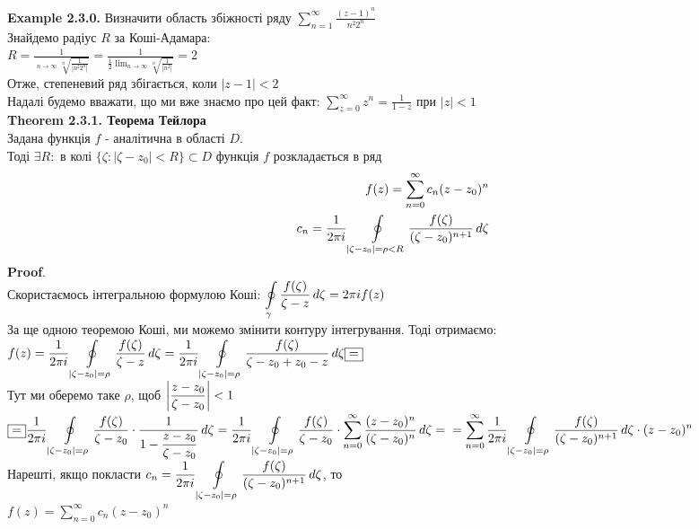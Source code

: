 \documentclass[a4paper, 14pt]{extarticle}
\DeclareMathOperator*\uplim{\overline{lim}}
\def\hugespace{\vspace{5mm} \\}
\begin{document}
	\textbf{Example 2.3.0.} Визначити область збіжності ряду $\displaystyle \sum_{n=1}^{\infty} \frac{(z-1)^n}{n^2 2^n}$\\
	Знайдемо радіус $R$ за Коші-Адамара:\\
	$R = \displaystyle\frac{1}{\displaystyle\uplim_{n \to \infty} \sqrt[n]{\frac{1}{|n^2 2^n|}}} = \frac{1}{\displaystyle \frac{1}{2} \lim_{n \to \infty} \sqrt[n]{\frac{1}{|n^2|}} } = 2$\\
	Отже, степеневий ряд збігається, коли $|z-1|<2$
	\hugespace
	Надалі будемо вважати, що ми вже знаємо про цей факт: $\displaystyle \sum_{z=0}^{\infty} z^n = \frac{1}{1-z}$ при $|z|<1$
	\hugespace
	
	\textbf{Theorem 2.3.1. Теорема Тейлора}\\
	Задана функція $f$ - аналітична в області $D$.\\ Тоді $\exists R:$ в колі $\{\zeta: |\zeta-z_0|<R\} \subset D$ функція $f$ розкладається в ряд
	\begin{align*}
	f(z) = \sum_{n=0}^{\infty} c_n(z-z_0)^n \\
	c_n = \frac{1}{2\pi i} \oint\displaylimits_{|\zeta-z_0|=\rho<R} \frac{f(\zeta)}{(\zeta-z_0)^{n+1}}\,d\zeta
	\end{align*}
	\textbf{Proof}.\\
	Скористаємось інтегральною формулою Коші:
	$\displaystyle \oint\displaylimits_{\gamma} \frac{f(\zeta)}{\zeta-z}\,d\zeta = 2\pi i f(z)$\\
	За ще одною теоремою Коші, ми можемо змінити контуру інтегрування. Тоді отримаємо:\\
	$f(z) = \displaystyle \frac{1}{2\pi i} \oint\displaylimits_{|\zeta-z_0|=\rho} \frac{f(\zeta)}{\zeta-z}\,d\zeta = \frac{1}{2\pi i}\oint\displaylimits_{|\zeta-z_0|=\rho} \frac{f(\zeta)}{\zeta-z_0+z_0-z}\,d\zeta \boxed{=}$\\
	Тут ми оберемо таке $\rho$, щоб $\displaystyle \abs{\frac{z-z_0}{\zeta - z_0}}<1$\\
	$\boxed{=} \displaystyle \frac{1}{2\pi i} \oint\displaylimits_{|\zeta-z_0|=\rho} \frac{f(\zeta)}{\zeta-z_0} \cdot \frac{1}{\displaystyle 1- \frac{z-z_0}{\zeta -z_0}} \,d\zeta = \frac{1}{2\pi i}\oint\displaylimits_{|\zeta-z_0|=\rho} \frac{f(\zeta)}{\zeta-z_0} \cdot \sum_{n=0}^{\infty} \frac{(z-z_0)^n}{(\zeta-z_0)^n} \,d\zeta = \\ = \sum_{n=0}^{\infty}\frac{1}{2\pi i} \oint\displaylimits_{|\zeta-z_0|=\rho} \frac{f(\zeta)}{(\zeta-z_0)^{n+1}} \,d\zeta \cdot (z-z_0)^n$\\
	Нарешті, якщо покласти $c_n = \displaystyle\frac{1}{2\pi i}\oint\displaylimits_{|\zeta-z_0|=\rho} \frac{f(\zeta)}{(\zeta-z_0)^{n+1}} \,d\zeta$, то\\ $f(z) = \displaystyle\sum_{n=0}^{\infty} c_n(z-z_0)^n$
\end{document}
